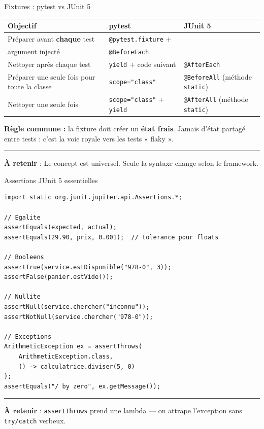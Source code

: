 \documentclass[aspectratio=169,11pt]{beamer}
\newcommand{\takeaway}[1]{%
\vfill\begin{beamercolorbox}[wd=\linewidth,sep=0.4em]{}
\color{accent2}\rule[0.6ex]{1.2em}{1.2pt}\hspace{0.4em}%
\textbf{\color{accent2}\small À retenir} \textcolor{textsoft}{:} %
{\small\color{textmain}#1}
\end{beamercolorbox}}
\begin{document}
\begin{frame}[t]{Fixtures : pytest vs JUnit 5}
\footnotesize
\begin{tabular}{@{}p{4.8cm} p{4.0cm} p{4.0cm}@{}}
\toprule
\textbf{\color{accent}Objectif} & \textbf{\color{accent}pytest} & \textbf{\color{accent}JUnit 5} \\
\midrule
Préparer avant \textbf{chaque} test & \texttt{@pytest.fixture} +\\ argument injecté & \texttt{@BeforeEach} \\
\addlinespace[0.2em]
Nettoyer après chaque test & \texttt{yield} + code suivant & \texttt{@AfterEach} \\
\addlinespace[0.2em]
Préparer une seule fois pour toute la classe & \texttt{scope="class"} & \texttt{@BeforeAll} (méthode \texttt{static}) \\
\addlinespace[0.2em]
Nettoyer une seule fois & \texttt{scope="class"} + \texttt{yield} & \texttt{@AfterAll} (méthode \texttt{static}) \\
\bottomrule
\end{tabular}
\vspace{0.5cm}
\textbf{Règle commune :} la fixture doit créer un \textbf{état frais}. Jamais d'état partagé entre tests : c'est la voie royale vers les tests « flaky ».
\takeaway{Le concept est universel. Seule la syntaxe change selon le framework.}
\end{frame}

\begin{frame}[fragile,t,shrink=20]{Assertions JUnit 5 essentielles}
\begin{lstlisting}[style=javadark]
import static org.junit.jupiter.api.Assertions.*;

// Egalite
assertEquals(expected, actual);
assertEquals(29.90, prix, 0.001);  // tolerance pour floats

// Booleens
assertTrue(service.estDisponible("978-0", 3));
assertFalse(panier.estVide());

// Nullite
assertNull(service.chercher("inconnu"));
assertNotNull(service.chercher("978-0"));

// Exceptions
ArithmeticException ex = assertThrows(
    ArithmeticException.class,
    () -> calculatrice.diviser(5, 0)
);
assertEquals("/ by zero", ex.getMessage());
\end{lstlisting}
\takeaway{\texttt{assertThrows} prend une lambda --- on attrape l'exception sans \texttt{try/catch} verbeux.}
\end{frame}
\end{document}
